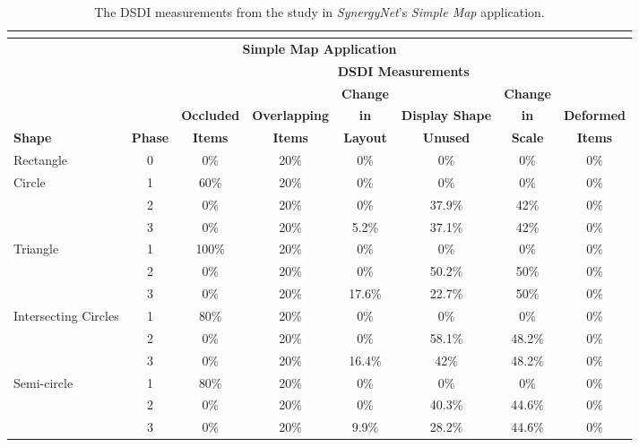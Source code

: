 \documentclass[twocolumn,compsoc]{cvm}
\newcommand{\smallline}{\arrayrulecolor{lightgray} \cline{2-8} \arrayrulecolor{black}}
\begin{document}
{\begin{table}[p]
	\begin{tabular}{ | l | c | c | c | c | c | c | c | }	
	\multicolumn{8}{c}{ } \\
	\hline
	\multicolumn{8}{|c|}{\textbf{Simple Map Application}} \\
	\hline
	& & \multicolumn{6}{c|}{\textbf{\ac{DSDI} Measurements}} \\
	\cline{3-8}
		& & & & \textbf{Change} & & \textbf{Change} & \\
		& & \textbf{Occluded} & \textbf{Overlapping} & \textbf{in} & \textbf{Display Shape} & \textbf{in} & \textbf{Deformed} \\
		\textbf{Shape} & \textbf{Phase} & \textbf{Items} & \textbf{Items} & \textbf{Layout} & \textbf{Unused} & \textbf{Scale} & \textbf{Items} \\ 
	\hline
		Rectangle & 0 & 0\% & 20\% & 0\% & 0\% & 0\% & 0\% \\  
	\hline
		\multirow{3}{*}{Circle} & 1 & 60\% & 20\% & 0\% & 0\% & 0\% & 0\% \\ \smallline
		& 2 & 0\% & 20\% & 0\% & 37.9\% & 42\% & 0\% \\ \smallline
		& 3 & 0\% & 20\% & 5.2\% & 37.1\% & 42\% & 0\% \\
	\hline
		\multirow{3}{*}{Triangle} & 1 & 100\% & 20\% & 0\% & 0\% & 0\% & 0\% \\ \smallline
		& 2 & 0\% & 20\% & 0\% & 50.2\% & 50\% & 0\% \\ \smallline
		& 3 & 0\% & 20\% & 17.6\% & 22.7\% & 50\% & 0\% \\
	\hline
		\multirow{3}{*}{Intersecting Circles} & 1 & 80\% & 20\% & 0\% & 0\% & 0\% & 0\% \\ \smallline
		& 2 & 0\% & 20\% & 0\% & 58.1\% & 48.2\% & 0\% \\ \smallline
		& 3 & 0\% & 20\% & 16.4\% & 42\% & 48.2\% & 0\% \\
	\hline
		\multirow{3}{*}{Semi-circle} & 1 & 80\% & 20\% & 0\% & 0\% & 0\% & 0\% \\ \smallline
		& 2 & 0\% & 20\% & 0\% & 40.3\% & 44.6\% & 0\% \\ \smallline
		& 3 & 0\% & 20\% & 9.9\% & 28.2\% & 44.6\% & 0\% \\ 
	\hline
	\end{tabular}
	\caption{The \ac{DSDI} measurements from the study in {\emph{SynergyNet}}'s {\emph{Simple Map}} application.}
	\label{tab:mapApp}
\end{table}

}
\end{document}
